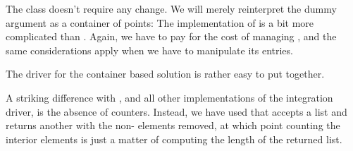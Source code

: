 The class  doesn't require any change. We will merely reinterpret the dummy
argument as a container of points:
%
%
%
The implementation of  is a bit more complicated than .
%
%
%
%
%
%
%
Again, we have to pay for the cost of managing , and the same considerations
apply when we have to manipulate its entries.

The driver for the container based solution is rather easy to put together.
%
%
%
%

A striking difference with , and all other implementations of the
integration driver, is the absence of counters. Instead, we have used  that
accepts a list and returns another with the non- elements removed, at which
point counting the interior elements is just a matter of computing the length of the returned list.

